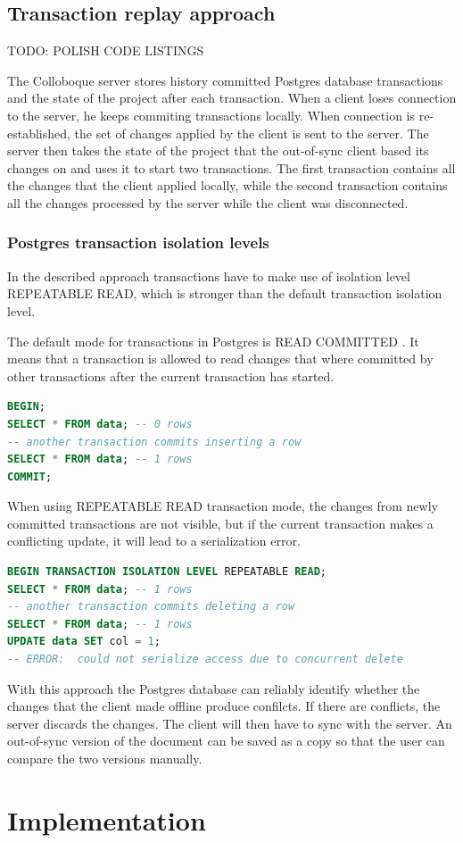 \documentclass[a4paper, 11pt, oneside]{article}
\theoremstyle{definition}
\begin{document}
\subsection{Transaction replay approach}
TODO: POLISH CODE LISTINGS

The Colloboque server stores history committed Postgres database transactions and the state of the project after each transaction. When a client loses connection to the server, he keeps commiting transactions locally. When connection is re-established, the set of changes applied by the client is sent to the server. The server then takes the state of the project that the out-of-sync client based its changes on and uses it to start two transactions. The first transaction contains all the changes that the client applied locally, while the second transaction contains all the changes processed by the server while the client was disconnected. 

\subsubsection{Postgres transaction isolation levels} 
In the described approach transactions have to make use of isolation level REPEATABLE READ, which is stronger than the default transaction isolation level.

The default mode for transactions in Postgres is READ COMMITTED \cite{tisolevel}. It means that a transaction is allowed to read changes that where committed by other transactions after the current transaction has started. 

\begin{lstlisting}[language=SQL]
BEGIN;
SELECT * FROM data; -- 0 rows
-- another transaction commits inserting a row
SELECT * FROM data; -- 1 rows
COMMIT;
\end{lstlisting}

When using REPEATABLE READ transaction mode, the changes from newly committed transactions are not visible, but if the current transaction makes a conflicting update, it will lead to a serialization error.

\begin{lstlisting}[language=SQL]
BEGIN TRANSACTION ISOLATION LEVEL REPEATABLE READ;
SELECT * FROM data; -- 1 rows
-- another transaction commits deleting a row
SELECT * FROM data; -- 1 rows
UPDATE data SET col = 1;
-- ERROR:  could not serialize access due to concurrent delete
\end{lstlisting}

With this approach the Postgres database can reliably identify whether the changes that the client made offline produce confilcts. If there are conflicts, the server discards the changes. The client will then have to sync with the server. An out-of-sync version of the document can be saved as a copy so that the user can compare the two versions manually.

\section{Implementation}

\newpage
\printbibliography
\clearpage
\end{document}
